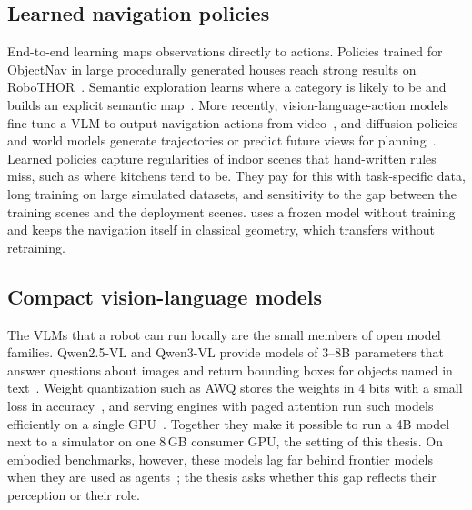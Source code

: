 \subsection{Learned navigation policies}
End-to-end learning maps observations directly to actions. Policies trained for ObjectNav in large procedurally
generated houses reach strong results on RoboTHOR~\cite{deitke2022procthor}. Semantic exploration learns where a
category is likely to be and builds an explicit semantic map~\cite{chaplot2020object}. More recently,
vision-language-action models fine-tune a VLM to output navigation actions from video~\cite{zhang2024navid,cheng2024navila,wei2025streamvln},
and diffusion policies and world models generate trajectories or predict future views for planning~\cite{sridhar2023nomad,cai2025navdp,bar2024navigation}.
Learned policies capture regularities of indoor scenes that hand-written rules miss, such as where kitchens tend
to be. They pay for this with task-specific data, long training on large simulated datasets, and sensitivity to the
gap between the training scenes and the deployment scenes. \ours uses a frozen model without training and keeps the
navigation itself in classical geometry, which transfers without retraining.

\subsection{Compact vision-language models}
The VLMs that a robot can run locally are the small members of open model families. Qwen2.5-VL and Qwen3-VL provide
models of 3--8B parameters that answer questions about images and return bounding boxes for objects named in
text~\cite{bai2025qwen25vl,bai2025qwen3vl}. Weight quantization such as AWQ stores the weights in 4 bits with a small
loss in accuracy~\cite{lin2024awq}, and serving engines with paged attention run such models efficiently on a single
GPU~\cite{kwon2023vllm}. Together they make it possible to run a 4B model next to a simulator on one 8\,GB consumer
GPU, the setting of this thesis. On embodied benchmarks, however, these models lag far behind frontier models when
they are used as agents~\cite{yang2025embodiedbench}; the thesis asks whether this gap reflects their perception or
their role.

